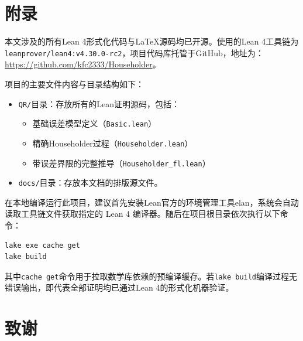 ﻿\documentclass[UTF8,a4paper,openany]{ctexbook}
\theoremstyle{qrplain}
\begin{document}
\chapter*{附录}

本文涉及的所有Lean 4形式化代码与\LaTeX 源码均已开源。使用的Lean 4工具链为\texttt{leanprover/lean4:v4.30.0-rc2}，项目代码库托管于GitHub，地址为：\url{https://github.com/kfc2333/Householder}。

项目的主要文件内容与目录结构如下：
\begin{itemize}
    \item \texttt{QR/}目录：存放所有的Lean证明源码，包括：
    \begin{itemize}
      \item 基础误差模型定义（\texttt{Basic.lean}）
      \item 精确Householder过程（\texttt{Householder.lean}）
      \item 带误差界限的完整推导（\texttt{Householder\_fl.lean}）
    \end{itemize}
    \item \texttt{docs/}目录：存放本文档的排版源文件。
\end{itemize}

在本地编译运行此项目，建议首先安装Lean官方的环境管理工具\textsf{elan}，系统会自动读取工具链文件获取指定的 Lean 4 编译器。随后在项目根目录依次执行以下命令：
\begin{verbatim}
lake exe cache get
lake build
\end{verbatim}

其中\texttt{cache get}命令用于拉取数学库依赖的预编译缓存。若\texttt{lake build}编译过程无错误输出，即代表全部证明均已通过Lean 4的形式化机器验证。

\chapter*{致谢}




\end{document}

